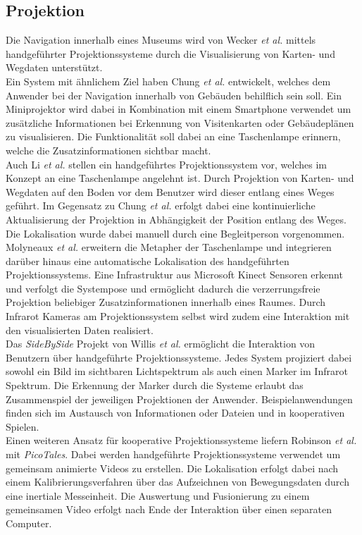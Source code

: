 \subsection{Projektion}
Die Navigation innerhalb eines Museums wird von Wecker \textit{et al.} \cite{Wecker2013} mittels handgeführter Projektionssysteme durch die Visualisierung von Karten- und Wegdaten unterstützt.\\
Ein System mit ähnlichem Ziel haben Chung \textit{et al.} \cite{Chung2011} entwickelt, welches dem Anwender bei der Navigation innerhalb von Gebäuden behilflich sein soll. Ein Miniprojektor wird dabei in Kombination mit einem Smartphone verwendet um zusätzliche Informationen bei Erkennung von Visitenkarten oder Gebäudeplänen zu visualisieren. Die Funktionalität soll dabei an eine Taschenlampe erinnern, welche die Zusatzinformationen sichtbar macht.\\
Auch Li \textit{et al.} \cite{Li2013} stellen ein handgeführtes Projektionssystem vor, welches im Konzept an eine Taschenlampe angelehnt ist. Durch Projektion von Karten- und Wegdaten auf den Boden vor dem Benutzer wird dieser entlang eines Weges geführt. Im Gegensatz zu Chung \textit{et al.} erfolgt dabei eine kontinuierliche Aktualisierung der Projektion in Abhängigkeit der Position entlang des Weges. Die Lokalisation wurde dabei manuell durch eine Begleitperson vorgenommen.\\
Molyneaux \textit{et al.} \cite{Molyneaux2012} erweitern die Metapher der Taschenlampe und integrieren darüber hinaus eine automatische Lokalisation des handgeführten Projektionssystems. Eine Infrastruktur aus Microsoft Kinect Sensoren erkennt und verfolgt die Systempose und ermöglicht dadurch die verzerrungsfreie Projektion beliebiger Zusatzinformationen innerhalb eines Raumes. Durch Infrarot Kameras am Projektionssystem selbst wird zudem eine Interaktion mit den visualisierten Daten realisiert.\\
Das \textit{SideBySide} Projekt von Willis \textit{et al.} \cite{Willis2011} ermöglicht die Interaktion von Benutzern über handgeführte Projektionssysteme. Jedes System projiziert dabei sowohl ein Bild im sichtbaren Lichtspektrum als auch einen Marker im Infrarot Spektrum. Die Erkennung der Marker durch die Systeme erlaubt das Zusammenspiel der jeweiligen Projektionen der Anwender. Beispielanwendungen finden sich im Austausch von Informationen oder Dateien und in kooperativen Spielen.\\
Einen weiteren Ansatz für kooperative Projektionssysteme liefern Robinson \textit{et al.} \cite{Robinson2012} mit \textit{PicoTales}. Dabei werden handgeführte Projektionssysteme verwendet um gemeinsam animierte Videos zu erstellen. Die Lokalisation erfolgt dabei nach einem Kalibrierungsverfahren über das Aufzeichnen von Bewegungsdaten durch eine inertiale Messeinheit. Die Auswertung und Fusionierung zu einem gemeinsamen Video erfolgt nach Ende der Interaktion über einen separaten Computer.\\
